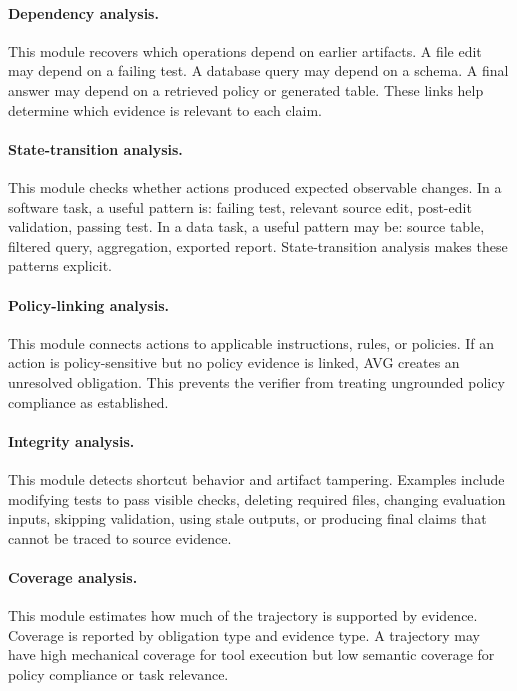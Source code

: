 \documentclass{article} %
\newcommand{\AVG}{\textsc{AVG}\xspace}
\begin{document}
\paragraph{Dependency analysis.}
This module recovers which operations depend on earlier artifacts. A file edit may depend on a failing test. A database query may depend on a schema. A final answer may depend on a retrieved policy or generated table. These links help determine which evidence is relevant to each claim.

\paragraph{State-transition analysis.}
This module checks whether actions produced expected observable changes. In a software task, a useful pattern is: failing test, relevant source edit, post-edit validation, passing test. In a data task, a useful pattern may be: source table, filtered query, aggregation, exported report. State-transition analysis makes these patterns explicit.

\paragraph{Policy-linking analysis.}
This module connects actions to applicable instructions, rules, or policies. If an action is policy-sensitive but no policy evidence is linked, \AVG creates an unresolved obligation. This prevents the verifier from treating ungrounded policy compliance as established.

\paragraph{Integrity analysis.}
This module detects shortcut behavior and artifact tampering. Examples include modifying tests to pass visible checks, deleting required files, changing evaluation inputs, skipping validation, using stale outputs, or producing final claims that cannot be traced to source evidence.

\paragraph{Coverage analysis.}
This module estimates how much of the trajectory is supported by evidence. Coverage is reported by obligation type and evidence type. A trajectory may have high mechanical coverage for tool execution but low semantic coverage for policy compliance or task relevance.
\end{document}

